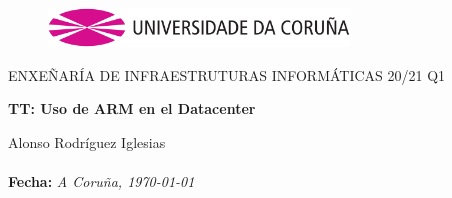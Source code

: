 \documentclass[a4paper,openright,12pt]{article}
\begin{document}
\clearpage

\begin{titlepage}

\begin{center}
\vspace*{-1in}
\vspace{3.5cm}
\begin{figure}[htb]
\begin{center}
\includegraphics[width=8cm]{img/udc.eps}
\end{center}
\end{figure}

\vspace*{1in}
\title {}
ENXEÑARÍA DE INFRAESTRUTURAS INFORMÁTICAS 20/21 Q1\\
\vspace*{0.5in}
\begin{Large}
\textbf{TT: Uso de ARM en el Datacenter}\\
\end{Large}

\vspace*{10cm}

\begin{large}
\raggedleft{}
Alonso Rodríguez Iglesias\\

\textbf{\\Fecha:}\emph{ A Coruña, \today}\\
\end{large}

\end{center}
\end{titlepage} 

\newpage


%

\tableofcontents
\newpage

\justifying{}
\end{document}
